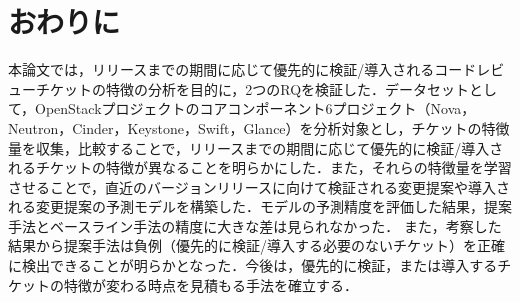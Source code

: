 \documentclass[T,J]{fose} %
\begin{document}
\section{おわりに}\label{sec:fig-tab-exp}
本論文では，リリースまでの期間に応じて優先的に検証/導入されるコードレビューチケットの特徴の分析を目的に，2つのRQを検証した．データセットとして，OpenStackプロジェクトのコアコンポーネント6プロジェクト（Nova，Neutron，Cinder，Keystone，Swift，Glance）を分析対象とし，チケットの特徴量を収集，比較することで，リリースまでの期間に応じて優先的に検証/導入されるチケットの特徴が異なることを明らかにした．また，それらの特徴量を学習させることで，直近のバージョンリリースに向けて検証される変更提案や導入される変更提案の予測モデルを構築した．モデルの予測精度を評価した結果，提案手法とベースライン手法の精度に大きな差は見られなかった．
また，考察した結果から提案手法は負例（優先的に検証/導入する必要のないチケット）を正確に検出できることが明らかとなった．今後は，優先的に検証，または導入するチケットの特徴が変わる時点を見積もる手法を確立する．


%
%


%


\end{document}
